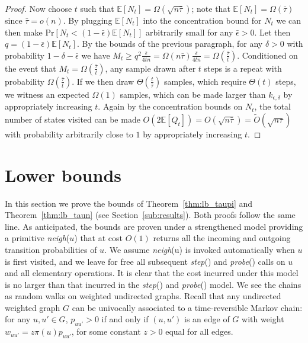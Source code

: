 \documentclass[a4paper,11pt]{article}
\newcommand{\neigh}[1]{\emph{neigh}(#1)}
\newcommand{\E}{\mathbb{E}}
\newcommand{\prob}{\text{Pr}}
\newcommand{\step}{\textit{step}}
\newcommand{\probe}{\textit{probe}}
\newcommand{\kerr}{k_{\epsilon,\delta}}
\begin{document}
\begin{proof}
Now choose $t$ such that $\E[N_{t}] = \Omega(\sqrt{n \bar{\tau}})$; note that $\E[N_{t}] = \Omega(\bar{\tau})$ since $\bar{\tau} = o(n)$.
By plugging $\E[N_{t}]$ into the concentration bound for $N_t$ we can then make $\prob[N_{t} < (1-\bar{\epsilon})\E[N_{t}]]$ arbitrarily small for any $\bar{\epsilon} > 0$.
Let then $q = (1-\bar{\epsilon})\E[N_{t}]$.
By the bounds of the previous paragraph, for any $\delta > 0$ with probability $1-\delta-\bar{\epsilon}$ we have $M_t \ge q^2\frac{\bar{\epsilon}}{4tn} = \Omega(n \bar{\tau}) \frac{\bar{\epsilon}}{4tn} = \Omega(\frac{\bar{\tau}}{t})$.
Conditioned on the event that $M_{t} = \Omega(\frac{\bar{\tau}}{t})$, any sample drawn after $t$ steps is a repeat with probability $\Omega(\frac{\bar{\tau}}{t})$.
If we then draw $\Theta(\frac{t}{\bar{\tau}})$ samples, which require $\Theta(t)$ steps, we witness an expected $\Omega(1)$ samples, which can be made larger than $\kerr$ by appropriately increasing $t$.
Again by the concentration bounds on $N_t$, the total number of states visited can be made $O(2\E[Q_t]) = O(\sqrt{n \bar{\tau}}) = \tilde{O}(\sqrt{n \tau})$ with probability arbitrarily close to $1$ by appropriately increasing $t$.
\end{proof}




%

\section{Lower bounds}
\label{sec:lb}
In this section we prove the bounds of Theorem~\ref{thm:lb_taupi} and Theorem~\ref{thm:lb_taun} (see Section~\ref{sub:results}).
Both proofs follow the same line.
As anticipated, the bounds are proven under a strengthened model providing a primitive \neigh{$u$} that at cost $O(1)$ returns all the incoming and outgoing transition probabilities of $u$.
We assume \neigh{u} is invoked automatically when $u$ is first visited, and we leave for free all subsequent \step() and \probe() calls on $u$ and all elementary operations.
It is clear that the cost incurred under this model is no larger than that incurred in the \step() and \probe() model.
We see the chains as random walks on weighted undirected graphs.
Recall that any undirected weighted graph $G$ can be univocally associated to a time-reversible Markov chain: for any $u,u' \in G$, $p_{uu'} > 0$ if and only if $(u,u')$ is an edge of $G$ with weight $w_{uu'} = z \pi(u)p_{uu'}$, for some constant $z >0$ equal for all edges.
\end{document}
